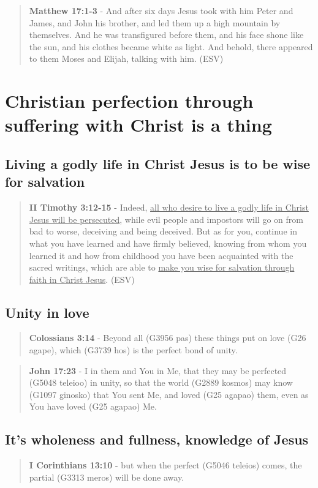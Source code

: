 \documentclass[11pt]{article}
\begin{document}
\begin{quote}
\textbf{Matthew 17:1-3} -  And after six days Jesus took with him Peter and James, and John his brother, and led them up a high mountain by themselves.  And he was transfigured before them, and his face shone like the sun, and his clothes became white as light.  And behold, there appeared to them Moses and Elijah, talking with him.  (ESV)
\end{quote}

\section{Christian perfection through suffering with Christ is a thing}
\label{sec:org34bd9c5}
\subsection{Living a godly life in Christ Jesus is to be wise for salvation}
\label{sec:org8fc6117}
\begin{quote}
\textbf{II Timothy 3:12-15} - Indeed, \uline{all who desire to live a godly life in Christ Jesus will be persecuted}, while evil people and impostors will go on from bad to worse, deceiving and being deceived. But as for you, continue in what you have learned and have firmly believed, knowing from whom you learned it and how from childhood you have been acquainted with the sacred writings, which are able to \uline{make you wise for salvation through faith in Christ Jesus}. (ESV)
\end{quote}

\subsection{Unity in love}
\label{sec:org24b172f}
\begin{quote}
\textbf{Colossians 3:14} - Beyond all (G3956 pas) these things put on love (G26 agape), which (G3739 hos) is the perfect bond of unity.
\end{quote}

\begin{quote}
\textbf{John 17:23} - I in them and You in Me, that they may be perfected (G5048 teleioo) in unity, so that the world (G2889 kosmos) may know (G1097 ginosko) that You sent Me, and loved (G25 agapao) them, even as You have loved (G25 agapao) Me.
\end{quote}

\subsection{It's wholeness and fullness, knowledge of Jesus}
\label{sec:org455dcad}
\begin{quote}
\textbf{I Corinthians 13:10} - but when the perfect (G5046 teleios) comes, the partial (G3313 meros) will be done away.
\end{quote}
\end{document}
